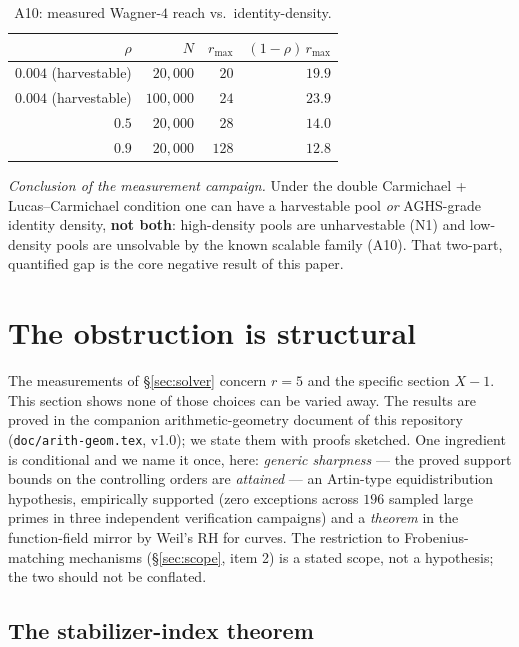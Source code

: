 \documentclass[11pt]{article}
\theoremstyle{remark}
\begin{document}
\begin{table}[ht]\centering\small
\begin{tabular}{@{}rrrr@{}}
\toprule
$\rho$ & $N$ & $r_{\max}$ & $(1-\rho)\,r_{\max}$ \\
\midrule
$0.004$ (harvestable) & $20{,}000$ & $20$ & $19.9$ \\
$0.004$ (harvestable) & $100{,}000$ & $24$ & $23.9$ \\
$0.5$ & $20{,}000$ & $28$ & $14.0$ \\
$0.9$ & $20{,}000$ & $128$ & $12.8$ \\
\bottomrule
\end{tabular}
\caption{A10: measured Wagner-$4$ reach vs.\ identity-density.}
\label{tab:a10}
\end{table}

\emph{Conclusion of the measurement campaign.} Under the double
Carmichael + Lucas--Carmichael condition one can have a harvestable pool
\emph{or} AGHS-grade identity density, \textbf{not both}: high-density
pools are unharvestable (N1) and low-density pools are unsolvable by the
known scalable family (A10). That two-part, quantified gap is the core
negative result of this paper.

\section{The obstruction is structural}\label{sec:structural}

The measurements of \S\ref{sec:solver} concern $r = 5$ and the specific
section $X - 1$. This section shows none of those choices can be varied
away. The results are proved in the companion arithmetic-geometry document
of this repository (\texttt{doc/arith-geom.tex}, v1.0); we state them with
proofs sketched. One ingredient is conditional and we name it once, here:
\emph{generic sharpness} --- the proved support bounds on the controlling
orders are \emph{attained} --- an Artin-type equidistribution hypothesis,
empirically supported (zero exceptions across $196$ sampled large primes in
three independent verification campaigns) and a \emph{theorem} in the
function-field mirror by Weil's RH for curves. The restriction to
Frobenius-matching mechanisms (\S\ref{sec:scope}, item 2) is a stated
scope, not a hypothesis; the two should not be conflated.

\subsection{The stabilizer-index theorem}
\end{document}
